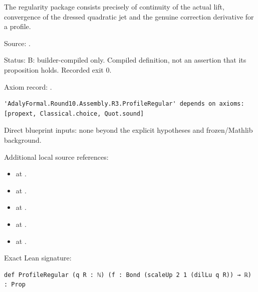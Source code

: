 \begin{definition}[bp-159]
\label{bp-159}
\uses{}
\leanok
The regularity package consists precisely of continuity of the actual lift, convergence of the dressed quadratic jet and the genuine correction derivative for a profile.

\par Source: \texttt{}.
\par Status: B: builder-compiled only. Compiled definition, not an assertion that its proposition holds. Recorded exit 0.
\par Axiom record: \texttt{}.
\begin{verbatim}
'AdalyFormal.Round10.Assembly.R3.ProfileRegular' depends on axioms: [propext, Classical.choice, Quot.sound]
\end{verbatim}
\par Direct blueprint inputs: none beyond the explicit hypotheses and frozen/Mathlib background.
\par Additional local source references:
\begin{itemize}
\item \texttt{} at \texttt{}.
\item \texttt{} at \texttt{}.
\item \texttt{} at \texttt{}.
\item \texttt{} at \texttt{}.
\item \texttt{} at \texttt{}.
\end{itemize}
\par Exact Lean signature:
\begin{verbatim}
def ProfileRegular (q R : ℕ) (f : Bond (scaleUp 2 1 (dilLu q R)) → ℝ) : Prop
\end{verbatim}
\end{definition}

